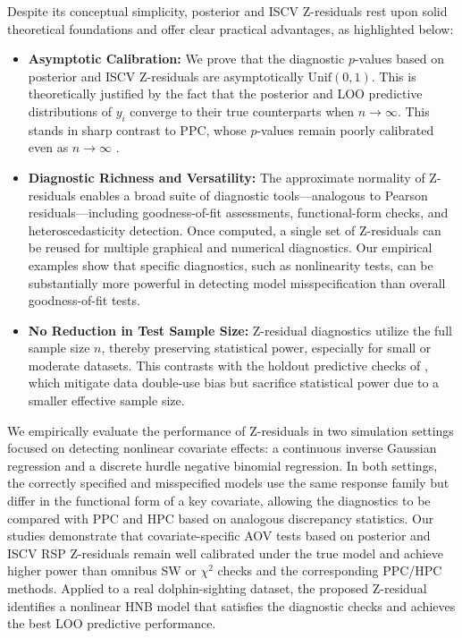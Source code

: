 Despite its conceptual simplicity, posterior and ISCV Z-residuals rest upon solid theoretical foundations and offer clear practical advantages, as highlighted below:
\begin{itemize}
    \item \textbf{Asymptotic Calibration:} We prove that the diagnostic $p$-values based on posterior and ISCV Z-residuals are asymptotically $\mathrm{Unif}(0,1)$. This is theoretically justified by the fact that the posterior and LOO predictive distributions of $y_i$ converge to their true counterparts when $n \to \infty$. This stands in sharp contrast to PPC, whose $p$-values remain poorly calibrated even as $n \to \infty$ \citep{Robins2000}.
    \item \textbf{Diagnostic Richness and Versatility:} The approximate normality of Z-residuals enables a broad suite of diagnostic tools---analogous to Pearson residuals---including goodness-of-fit assessments, functional-form checks, and heteroscedasticity detection. Once computed, a single set of Z-residuals can be reused for multiple graphical and numerical diagnostics. Our empirical examples show that specific diagnostics, such as nonlinearity tests, can be substantially more powerful in detecting model misspecification than overall goodness-of-fit tests.
    \item \textbf{No Reduction in Test Sample Size:} Z-residual diagnostics utilize the full sample size $n$, thereby preserving statistical power, especially for small or moderate datasets. This contrasts with the holdout predictive checks of \citet{moranHoldoutPredictiveChecks2024}, which mitigate data double-use bias but sacrifice statistical power due to a smaller effective sample size.
\end{itemize}

We empirically evaluate the performance of Z-residuals in two simulation settings focused on detecting nonlinear covariate effects: a continuous inverse Gaussian regression and a discrete hurdle negative binomial regression. In both settings, the correctly specified and misspecified models use the same response family but differ in the functional form of a key covariate, allowing the diagnostics to be compared with PPC and HPC based on analogous discrepancy statistics. Our studies demonstrate that covariate-specific AOV tests based on posterior and ISCV RSP Z-residuals remain well calibrated under the true model and achieve higher power than omnibus SW or $\chi^2$ checks and the corresponding PPC/HPC methods. Applied to a real dolphin-sighting dataset, the proposed Z-residual identifies a nonlinear HNB model that satisfies the diagnostic checks and achieves the best LOO predictive performance. 

